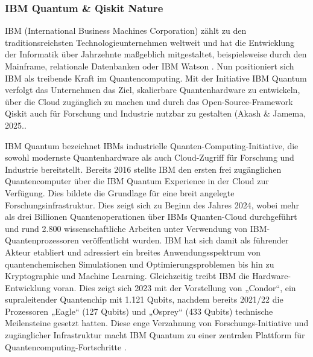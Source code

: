 \subsubsection*{IBM Quantum & Qiskit Nature} 

IBM (International Business Machines Corporation) zählt zu den traditionsreichsten Technologieunternehmen weltweit und hat die Entwicklung der Informatik über Jahrzehnte maßgeblich mitgestaltet, beispielsweise durch den Mainframe, relationale Datenbanken oder IBM Watson \cite{aruteQuantumSupremacyUsing2019a}. Nun positioniert sich IBM als treibende Kraft im Quantencomputing. Mit der Initiative IBM Quantum verfolgt das Unternehmen das Ziel, skalierbare Quantenhardware zu entwickeln, über die Cloud zugänglich zu machen und durch das Open-Source-Framework Qiskit auch für Forschung und Industrie nutzbar zu gestalten \cite{} (Akash & Jamema, 2025.\cite{miceliQuantumComputationVisualization2018}. 

IBM Quantum bezeichnet IBMs industrielle Quanten-Computing-Initiative, die sowohl modernste Quantenhardware als auch Cloud-Zugriff für Forschung und Industrie bereitstellt. Bereits 2016 stellte IBM den ersten frei zugänglichen Quantencomputer über die IBM Quantum Experience in der Cloud zur Verfügung. Dies bildete die Grundlage für eine breit angelegte Forschungsinfrastruktur. Dies zeigt sich zu Beginn des Jahres 2024, wobei mehr als drei Billionen Quantenoperationen über IBMs Quanten-Cloud durchgeführt und rund 2.800 wissenschaftliche Arbeiten unter Verwendung von IBM-Quantenprozessoren veröffentlicht wurden. IBM hat sich damit als führender Akteur etabliert und adressiert ein breites Anwendungsspektrum von quantenchemischen Simulationen und Optimierungsproblemen bis hin zu Kryptographie und Machine Learning. Gleichzeitig treibt IBM die Hardware-Entwicklung voran. Dies zeigt sich 2023 mit der Vorstellung von „Condor“, ein supraleitender Quantenchip mit 1.121 Qubits, nachdem bereits 2021/22 die Prozessoren „Eagle“ (127 Qubits) und „Osprey“ (433 Qubits) technische Meilensteine gesetzt hatten. Diese enge Verzahnung von Forschungs-Initiative und zugänglicher Infrastruktur macht IBM Quantum zu einer zentralen Plattform für Quantencomputing-Fortschritte \citealp[2]{abughanemIBMQuantumComputers2025}.


